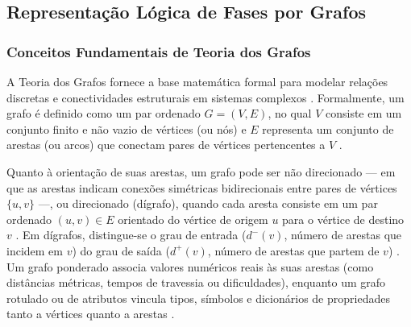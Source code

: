 \subsection{Representação Lógica de Fases por Grafos}
\label{sec:grafos}

\subsubsection{Conceitos Fundamentais de Teoria dos Grafos}
\label{sec:conceitos_grafos}

A Teoria dos Grafos fornece a base matemática formal para modelar relações discretas e conectividades estruturais em sistemas complexos \cite{cormen2009introduction, summerville2018procedural}. Formalmente, um grafo é definido como um par ordenado $G = (V, E)$, no qual $V$ consiste em um conjunto finito e não vazio de vértices (ou nós) e $E$ representa um conjunto de arestas (ou arcos) que conectam pares de vértices pertencentes a $V$ \cite{cormen2009introduction, maleki2024procedural}.

Quanto à orientação de suas arestas, um grafo pode ser não direcionado --- em que as arestas indicam conexões simétricas bidirecionais entre pares de vértices $\{u, v\}$ ---, ou direcionado (dígrafo), quando cada aresta consiste em um par ordenado $(u, v) \in E$ orientado do vértice de origem $u$ para o vértice de destino $v$ \cite{cormen2009introduction, dormans2010}. Em dígrafos, distingue-se o grau de entrada ($d^-(v)$, número de arestas que incidem em $v$) do grau de saída ($d^+(v)$, número de arestas que partem de $v$) \cite{cormen2009introduction}. Um grafo ponderado associa valores numéricos reais às suas arestas (como distâncias métricas, tempos de travessia ou dificuldades), enquanto um grafo rotulado ou de atributos vincula tipos, símbolos e dicionários de propriedades tanto a vértices quanto a arestas \cite{dormans2010, linden2013designing, linden2014dungeons, chen2025narrative}.

